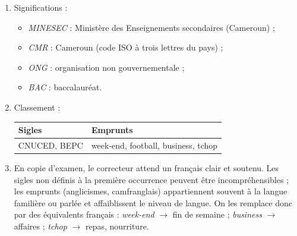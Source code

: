 \documentclass[11pt]{article}
\begin{document}
\begin{corrige}
\begin{enumerate}
\item Significations :
\begin{itemize}
\item \emph{MINESEC} : Ministère des Enseignements secondaires (Cameroun) ;
\item \emph{CMR} : Cameroun (code ISO à trois lettres du pays) ;
\item \emph{ONG} : organisation non gouvernementale ;
\item \emph{BAC} : baccalauréat.
\end{itemize}
\item Classement :
\begin{center}
\begin{tabularx}{\linewidth}{|X|X|}
\hline
\rowcolor{popblueL} \textbf{Sigles} & \textbf{Emprunts} \\
\hline
CNUCED, BEPC & week-end, football, business, tchop \\
\hline
\end{tabularx}
\end{center}
\item En copie d'examen, le correcteur attend un français clair et soutenu. Les sigles non définis à la première occurrence peuvent être incompréhensibles ; les emprunts (anglicismes, camfranglais) appartiennent souvent à la langue familière ou parlée et affaiblissent le niveau de langue. On les remplace donc par des équivalents français : \emph{week-end} $\rightarrow$ fin de semaine ; \emph{business} $\rightarrow$ affaires ; \emph{tchop} $\rightarrow$ repas, nourriture.
\end{enumerate}
\end{corrige}
\end{document}
